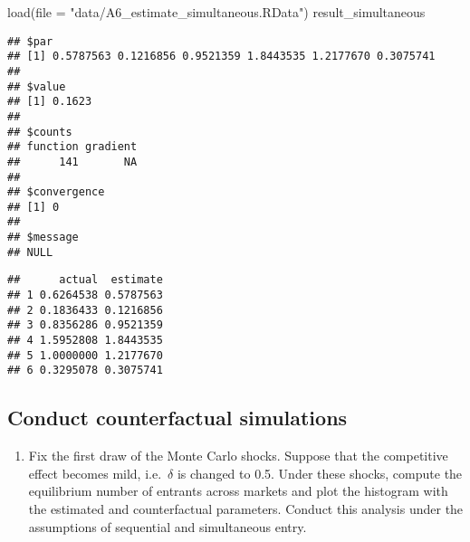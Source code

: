 \documentclass[
]{article}
\newenvironment{Shaded}{\begin{snugshade}}{\end{snugshade}}
\newcommand{\AttributeTok}[1]{\textcolor[rgb]{0.77,0.63,0.00}{#1}}
\newcommand{\FunctionTok}[1]{\textcolor[rgb]{0.00,0.00,0.00}{#1}}
\newcommand{\NormalTok}[1]{#1}
\newcommand{\OtherTok}[1]{\textcolor[rgb]{0.56,0.35,0.01}{#1}}
\newcommand{\SpecialCharTok}[1]{\textcolor[rgb]{0.00,0.00,0.00}{#1}}
\newcommand{\StringTok}[1]{\textcolor[rgb]{0.31,0.60,0.02}{#1}}
\providecommand{\tightlist}{%
  \setlength{\itemsep}{0pt}\setlength{\parskip}{0pt}}
\begin{document}
\begin{Shaded}
\begin{Highlighting}[]
\FunctionTok{load}\NormalTok{(}\AttributeTok{file =} \StringTok{"data/A6\_estimate\_simultaneous.RData"}\NormalTok{)}
\NormalTok{result\_simultaneous}
\end{Highlighting}
\end{Shaded}

\begin{verbatim}
## $par
## [1] 0.5787563 0.1216856 0.9521359 1.8443535 1.2177670 0.3075741
## 
## $value
## [1] 0.1623
## 
## $counts
## function gradient 
##      141       NA 
## 
## $convergence
## [1] 0
## 
## $message
## NULL
\end{verbatim}

\begin{Shaded}
\end{Shaded}

\begin{verbatim}
##      actual  estimate
## 1 0.6264538 0.5787563
## 2 0.1836433 0.1216856
## 3 0.8356286 0.9521359
## 4 1.5952808 1.8443535
## 5 1.0000000 1.2177670
## 6 0.3295078 0.3075741
\end{verbatim}

\hypertarget{conduct-counterfactual-simulations}{%
\subsection{Conduct counterfactual
simulations}\label{conduct-counterfactual-simulations}}

\begin{enumerate}
\def\labelenumi{\arabic{enumi}.}
\tightlist
\item
  Fix the first draw of the Monte Carlo shocks. Suppose that the
  competitive effect becomes mild, i.e.~\(\delta\) is changed to 0.5.
  Under these shocks, compute the equilibrium number of entrants across
  markets and plot the histogram with the estimated and counterfactual
  parameters. Conduct this analysis under the assumptions of sequential
  and simultaneous entry.
\end{enumerate}
\end{document}
